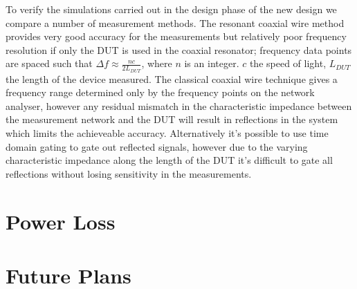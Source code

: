 \documentclass[a4paper,
              ]{jacow}
\begin{document}
To verify the simulations carried out in the design phase of the new design we compare a number of measurement methods. The resonant coaxial wire method provides very good accuracy for the measurements but relatively poor frequency resolution if only the DUT is used in the coaxial resonator; frequency data points are spaced such that $\Delta f \approx \frac{nc}{2L_{DUT}}$, where $n$ is an integer. $c$ the speed of light, $L_{DUT}$ the length of the device measured. The classical coaxial wire technique gives a frequency range determined only by the frequency points on the network analyser, however any residual mismatch in the characteristic impedance between the measurement network and the DUT will result in reflections in the system which limits the achieveable accuracy. Alternatively it's possible to use time domain gating to gate out reflected signals, however due to the varying characteristic impedance along the length of the DUT it's difficult to gate all reflections without losing sensitivity in the measurements.

\section{Power Loss}




\section{Future Plans}

%
%
%

% 
\end{document}
